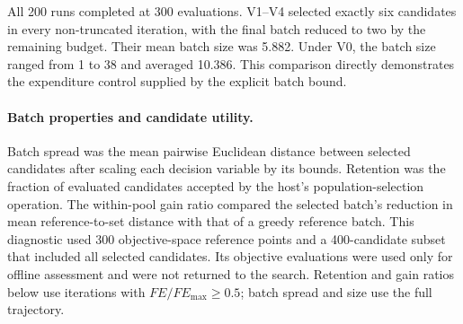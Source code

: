 All 200 runs completed at 300 evaluations. V1--V4 selected exactly six
candidates in every non-truncated iteration, with the final batch
reduced to two by the remaining budget. Their mean batch size was
5.882. Under V0, the batch size ranged from 1 to 38 and averaged 10.386.
This comparison directly demonstrates the expenditure control supplied
by the explicit batch bound.

\paragraph{Batch properties and candidate utility.}
Batch spread was the mean pairwise Euclidean distance between selected
candidates after scaling each decision variable by its bounds. Retention was the fraction of evaluated candidates accepted
by the host's population-selection operation. The within-pool gain
ratio compared the selected batch's reduction in mean reference-to-set
distance with that of a greedy reference batch. This diagnostic used
300 objective-space reference points and a 400-candidate subset that
included all selected candidates. Its objective evaluations were used
only for offline assessment and were not returned to the search.
Retention and gain ratios below use iterations with
$FE/FE_{\max}\geq0.5$; batch spread and size use the full trajectory.

